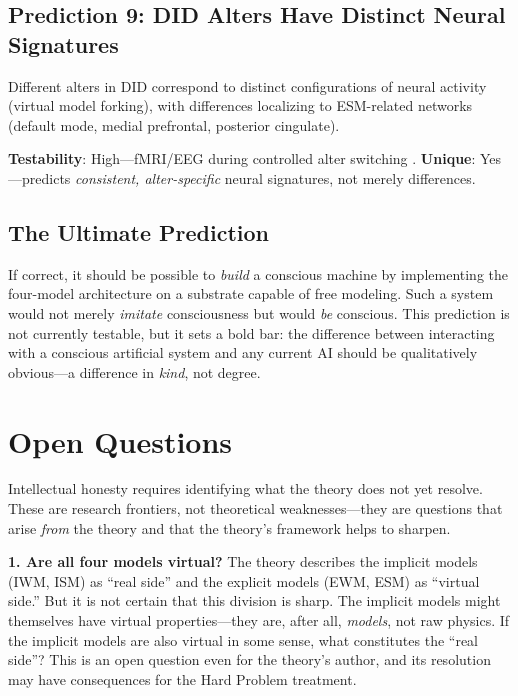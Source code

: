 \documentclass[12pt]{article}
\begin{document}
\subsection{Prediction 9: DID Alters Have Distinct Neural Signatures}

Different alters in DID correspond to distinct configurations of neural activity (virtual model forking), with differences localizing to ESM-related networks (default mode, medial prefrontal, posterior cingulate).

\textbf{Testability}: High---\hspace{0pt}fMRI/EEG during controlled alter switching \citep{Reinders2003,Reinders2008}. \textbf{Unique}: Yes---\hspace{0pt}predicts \emph{consistent, alter-specific} neural signatures, not merely differences.


\subsection{The Ultimate Prediction}

If correct, it should be possible to \emph{build} a conscious machine by implementing the four-model architecture on a substrate capable of free modeling. Such a system would not merely \emph{imitate} consciousness but would \emph{be} conscious. This prediction is not currently testable, but it sets a bold bar: the difference between interacting with a conscious artificial system and any current AI should be qualitatively obvious---\hspace{0pt}a difference in \emph{kind}, not degree.



\section{Open Questions}

Intellectual honesty requires identifying what the theory does not yet resolve. These are research frontiers, not theoretical weaknesses---\hspace{0pt}they are questions that arise \emph{from} the theory and that the theory's framework helps to sharpen.

\textbf{1. Are all four models virtual?} The theory describes the implicit models (IWM, ISM) as ``real side'' and the explicit models (EWM, ESM) as ``virtual side.'' But it is not certain that this division is sharp. The implicit models might themselves have virtual properties---\hspace{0pt}they are, after all, \emph{models}, not raw physics. If the implicit models are also virtual in some sense, what constitutes the ``real side''? This is an open question even for the theory's author, and its resolution may have consequences for the Hard Problem treatment.
\end{document}

